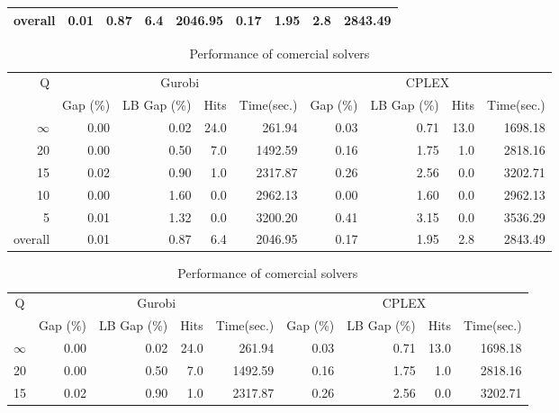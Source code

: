 \begin{table}[H]
\begin{tabular}{r rrrr rrrr}
\midrule
 overall &     0.01 &        0.87 &  6.4 &    2046.95 &     0.17 &        1.95 &  2.8 &    2843.49 \\
\bottomrule
\end{tabular}
\end{table}\begin{table}[H]
\centering
\caption{Performance of comercial solvers}
\label{tab:solvers_results}
\begin{tabular}{r rrrr rrrr}
\toprule
       Q & \multicolumn{4}{c}{Gurobi} & \multicolumn{4}{c}{CPLEX} \\
         & Gap (\%) & LB Gap (\%) & Hits & Time(sec.) & Gap (\%) & LB Gap (\%) & Hits & Time(sec.) \\
\midrule
$\infty$ &     0.00 &        0.02 & 24.0 &     261.94 &     0.03 &        0.71 & 13.0 &    1698.18 \\
      20 &     0.00 &        0.50 &  7.0 &    1492.59 &     0.16 &        1.75 &  1.0 &    2818.16 \\
      15 &     0.02 &        0.90 &  1.0 &    2317.87 &     0.26 &        2.56 &  0.0 &    3202.71 \\
      10 &     0.00 &        1.60 &  0.0 &    2962.13 &     0.00 &        1.60 &  0.0 &    2962.13 \\
       5 &     0.01 &        1.32 &  0.0 &    3200.20 &     0.41 &        3.15 &  0.0 &    3536.29 \\
\midrule
 overall &     0.01 &        0.87 &  6.4 &    2046.95 &     0.17 &        1.95 &  2.8 &    2843.49 \\
\bottomrule
\end{tabular}
\end{table}\begin{table}[H]
\centering
\caption{Performance of comercial solvers}
\label{tab:solvers_results}
\begin{tabular}{c rrrr rrrr}
\toprule
       Q & \multicolumn{4}{c}{Gurobi} & \multicolumn{4}{c}{CPLEX} \\
         & Gap (\%) & LB Gap (\%) & Hits & Time(sec.) & Gap (\%) & LB Gap (\%) & Hits & Time(sec.) \\
\midrule
$\infty$ &     0.00 &        0.02 & 24.0 &     261.94 &     0.03 &        0.71 & 13.0 &    1698.18 \\
      20 &     0.00 &        0.50 &  7.0 &    1492.59 &     0.16 &        1.75 &  1.0 &    2818.16 \\
      15 &     0.02 &        0.90 &  1.0 &    2317.87 &     0.26 &        2.56 &  0.0 &    3202.71 \\

\end{tabular}
\end{table}
